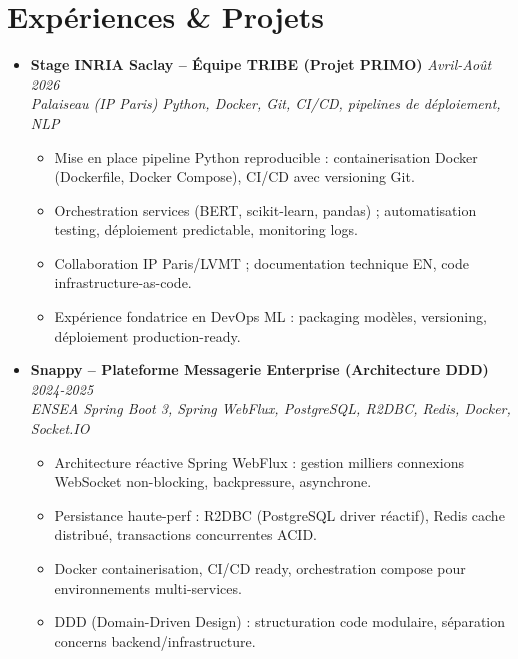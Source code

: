 \documentclass[a4paper,11pt]{article}
\begin{document}
\section{Exp\'eriences \& Projets}
\begin{itemize}[leftmargin=*, label=\tiny$\bullet$, nosep]
    \item \textbf{Stage INRIA Saclay -- \'Equipe TRIBE (Projet PRIMO)} \hfill \textit{Avril-Ao\^ut 2026} \\
    \textit{Palaiseau (IP Paris)} \hfill \textit{Python, Docker, Git, CI/CD, pipelines de d\'eploiement, NLP}
    \vspace{-2pt}
    \begin{itemize}[leftmargin=0.4cm, nosep, label=\tiny$\bullet$]
        \item \small{Mise en place pipeline Python reproducible : containerisation Docker (Dockerfile, Docker Compose), CI/CD avec versioning Git.}
        \item \small{Orchestration services (BERT, scikit-learn, pandas) ; automatisation testing, d\'eploiement predictable, monitoring logs.}
        \item \small{Collaboration IP Paris/LVMT ; documentation technique EN, code infrastructure-as-code.}
        \item \small{Exp\'erience fondatrice en DevOps ML : packaging mod\`eles, versioning, d\'eploiement production-ready.}
    \end{itemize}
    \vspace{3pt}

    \item \textbf{Snappy -- Plateforme Messagerie Enterprise (Architecture DDD)} \hfill \textit{2024-2025} \\
    \textit{ENSEA} \hfill \textit{Spring Boot 3, Spring WebFlux, PostgreSQL, R2DBC, Redis, Docker, Socket.IO}
    \vspace{-2pt}
    \begin{itemize}[leftmargin=0.4cm, nosep, label=\tiny$\bullet$]
        \item \small{Architecture r\'eactive Spring WebFlux : gestion milliers connexions WebSocket non-blocking, backpressure, asynchrone.}
        \item \small{Persistance haute-perf : R2DBC (PostgreSQL driver r\'eactif), Redis cache distribu\'e, transactions concurrentes ACID.}
        \item \small{Docker containerisation, CI/CD ready, orchestration compose pour environnements multi-services.}
        \item \small{DDD (Domain-Driven Design) : structuration code modulaire, s\'eparation concerns backend/infrastructure.}
    \end{itemize}
    \vspace{3pt}


\end{itemize}
\end{document}
